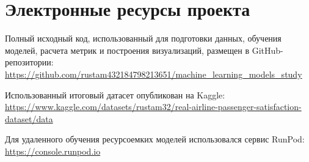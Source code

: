 \documentclass[14pt,a4paper]{extreport}
\begin{document}
\appendix
\chapter{Электронные ресурсы проекта}
\label{app:electronic-resources}
Полный исходный код, использованный для подготовки данных, обучения моделей, расчета метрик и построения визуализаций, размещен в GitHub-репозитории:\\
\url{https://github.com/rustam432184798213651/machine_learning_models_study}

Использованный итоговый датасет опубликован на Kaggle:\\
\url{https://www.kaggle.com/datasets/rustam32/real-airline-passenger-satisfaction-dataset/data}

Для удаленного обучения ресурсоемких моделей использовался сервис RunPod:\\
\url{https://console.runpod.io}
\end{document}
